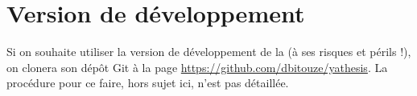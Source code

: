 
\section{Version de développement}
\label{sec:vers-de-devel}

Si on souhaite utiliser la version de développement de la \yatcl{} (à ses
risques et périls !), on clonera son dépôt Git à la page
\url{https://github.com/dbitouze/yathesis}. La procédure pour ce faire, hors
sujet ici, n'est pas détaillée.

%
\iffalse
\fi
